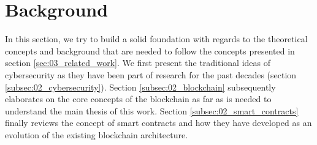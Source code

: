 \section{Background}
\label{sec:02_background}

In this section, we try to build a solid foundation with regards to the theoretical concepts and background that are needed to follow the concepts presented in section \ref{sec:03_related_work}. We first present the traditional ideas of cybersecurity as they have been part of research for the past decades (section \ref{subsec:02_cybersecurity}). Section \ref{subsec:02_blockchain} subsequently elaborates on the core concepts of the blockchain as far as is needed to understand the main thesis of this work. Section \ref{subsec:02_smart_contracts} finally reviews the concept of smart contracts and how they have developed as an evolution of the existing blockchain architecture.





